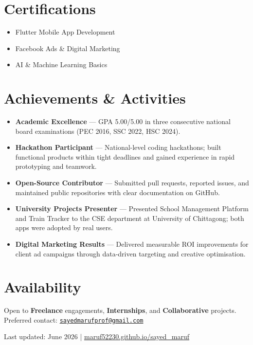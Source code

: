 \documentclass[10pt, a4paper]{article}
\begin{document}
\section{Certifications}

\begin{itemize}
  \item Flutter Mobile App Development
  \item Facebook Ads \& Digital Marketing
  \item AI \& Machine Learning Basics
\end{itemize}

\section{Achievements \& Activities}

\begin{itemize}
  \item \textbf{Academic Excellence} — GPA 5.00/5.00 in three consecutive national board examinations
        (PEC 2016, SSC 2022, HSC 2024).
  \item \textbf{Hackathon Participant} — National-level coding hackathons; built functional products
        within tight deadlines and gained experience in rapid prototyping and teamwork.
  \item \textbf{Open-Source Contributor} — Submitted pull requests, reported issues, and maintained
        public repositories with clear documentation on GitHub.
  \item \textbf{University Projects Presenter} — Presented School Management Platform and Train Tracker
        to the CSE department at University of Chittagong; both apps were adopted by real users.
  \item \textbf{Digital Marketing Results} — Delivered measurable ROI improvements for client ad
        campaigns through data-driven targeting and creative optimisation.
\end{itemize}

\section{Availability}

Open to \textbf{Freelance} engagements, \textbf{Internships}, and \textbf{Collaborative} projects.
Preferred contact: \href{mailto:sayedmarufprof@gmail.com}{\texttt{sayedmarufprof@gmail.com}}

\vfill
\begin{center}
  \footnotesize\color{mid}
  Last updated: June 2026 \quad|\quad
  \href{https://maruf52230.github.io/sayed_maruf/}{maruf52230.github.io/sayed\_maruf}
\end{center}
\end{document}
